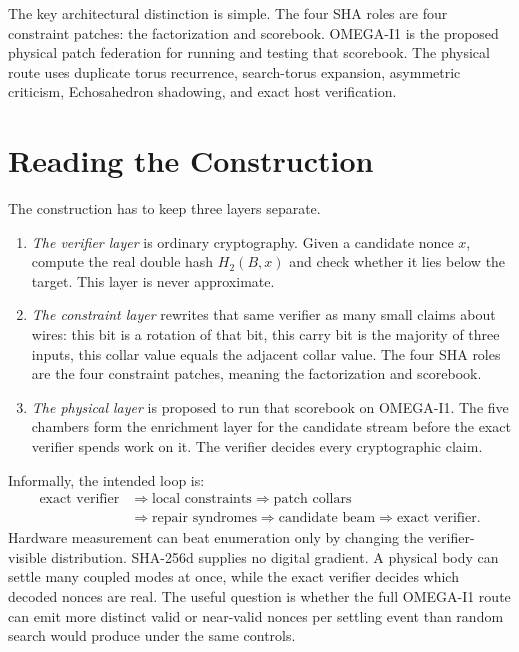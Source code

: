 \documentclass[11pt]{article}
\theoremstyle{definition}
\theoremstyle{remark}
\begin{document}
The key architectural distinction is simple. The four SHA roles are four
constraint patches: the factorization and scorebook. OMEGA-I1 is the proposed
physical patch federation for running and testing that scorebook. The physical
route uses duplicate torus recurrence, search-torus expansion, asymmetric
criticism, Echosahedron shadowing, and exact host verification.

\section{Reading the Construction}

The construction has to keep three layers separate.

\begin{enumerate}
\item \emph{The verifier layer} is ordinary cryptography. Given a candidate
nonce \(x\), compute the real double hash \(H_2(B,x)\) and check whether it lies
below the target. This layer is never approximate.
\item \emph{The constraint layer} rewrites that same verifier as many small
claims about wires: this bit is a rotation of that bit, this carry bit is the
majority of three inputs, this collar value equals the adjacent collar value.
The four SHA roles are the four constraint patches, meaning the factorization
and scorebook.
\item \emph{The physical layer} is proposed to run that scorebook on OMEGA-I1. The five
chambers form the enrichment layer for the candidate stream before the exact
verifier spends work on it. The verifier decides every cryptographic claim.
\end{enumerate}

Informally, the intended loop is:
\[
\begin{aligned}
\text{exact verifier}
&\Rightarrow
\text{local constraints}
\Rightarrow
\text{patch collars}\\
&\Rightarrow
\text{repair syndromes}
\Rightarrow
\text{candidate beam}
\Rightarrow
\text{exact verifier}.
\end{aligned}
\]
Hardware measurement can beat enumeration only by changing the
verifier-visible distribution. SHA-256d supplies no digital gradient. A physical
body can settle many coupled modes at once, while the exact verifier decides
which decoded nonces are real. The useful question is whether the full OMEGA-I1
route can emit more distinct valid or near-valid nonces per settling event than
random search would produce under the same controls.
\end{document}

